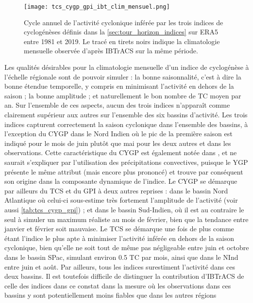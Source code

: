 \documentclass[../main.tex]{subfiles}
\begin{document}
\begin{figure}[tb]
    \centering
    \texttt{[image: tcs\_cygp\_gpi\_ibt\_clim\_mensuel.png]}
    \caption{Cycle annuel de l'activité cyclonique inférée par les trois indices de cyclogénèses définis dans la \cref{sec:tour_horizon_indices} sur
    ERA5 entre 1981 et 2019. Le tracé en tirets noirs indique la climatologie mensuelle observée d'après IBTrACS sur la même période.}
    \label{fig:tcs_cygp_gpi_clim_mensuel}
\end{figure}

Les qualités désirables pour la climatologie mensuelle d'un indice de cyclogénèse à l'échelle régionale sont de pouvoir simuler : la bonne saisonnalité, c'est à
dire la bonne étendue temporelle, y compris en minimisant l'activité en dehors de la saison ; la bonne amplitude ; et naturellement le bon nombre de TC moyen
par an. Sur l'ensemble de ces aspects, aucun des trois indices n'apparaît comme clairement supérieur aux autres sur l'ensemble des six bassins d'activité. Les
trois indices capturent correctement la saison cyclonique dans l'ensemble des bassins, à l'exception du CYGP dans le Nord Indien où le pic de la première saison
est indiqué pour le mois de juin plutôt que mai pour les deux autres et dans les observations. Cette caractéristique du CYGP est également notée dans
\textcite{menkes_comparison_2012}, et ne saurait s'expliquer par l'utilisation des précipitations convectives, puisque le YGP présente le même attribut (mais
encore plus prononcé) et trouve par conséquent son origine dans la composante dynamique de l'indice. Le CYGP se démarque par ailleurs du TCS et du GPI à deux
autres reprises : dans le bassin Nord Atlantique où celui-ci sous-estime très fortement l'amplitude de l'activité (voir aussi \cref{tab:tcs_cygp_gpi}) ; et dans
le bassin Sud-Indien, où il est au contraire le seul à simuler un maximum réaliste au mois de février, bien que la tendance entre janvier et février soit
mauvaise. Le TCS se démarque une fois de plus comme étant l'indice le plus apte à minimiser l'activité inférée en dehors de la saison cyclonique, bien qu'elle
ne soit tout de même pas négligeable entre juin et octobre dans le bassin SPac, simulant environ \num{0.5} TC par mois, ainsi que dans le NInd entre juin et
août. Par ailleurs, tous les indices surestiment l'activité dans ces deux bassins. Il est toutefois difficile de distinguer la contribution d'IBTrACS de celle
des indices dans ce constat dans la mesure où les observations dans ces bassins y sont potentiellement moins fiables que dans les autres régions
\end{document}
